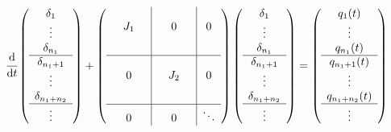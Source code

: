 \documentclass[]{uai2023}
\newcommand{\dt}[1]{\cfrac{\mathrm{d} #1}{\mathrm{d} t}}
\begin{document}
        \begin{equation}
            \dt{} 
            \left(\begin{array}{c}
                \delta_{1} \\ \vdots \\ \delta_{n_1} \\ 
                \hline
                \delta_{n_1 + 1} \\ \vdots \\ \delta_{n_1 + n_2} \\ 
                \hline
                \vdots 
            \end{array}\right)
            +
            \left(\begin{array}{c|c|c}
                \begin{matrix} && \\ &J_1& \\ && \end{matrix} & 0 & 0 \\[1.9em]
                \hline
                0 & \begin{matrix} && \\ &J_2& \\ && \end{matrix} & 0 \\[1.9em]
                \hline
                0 & 0 & \ddots 
            \end{array}\right)
            \left(\begin{array}{c}
                \delta_{1} \\ \vdots \\ \delta_{n_1} \\ 
                \hline
                \delta_{n_1 + 1} \\ \vdots \\ \delta_{n_1 + n_2} \\ 
                \hline
                \vdots 
            \end{array}\right)
            =
            \left(\begin{array}{c}
                q_{1}(t)\\\vdots\\ q_{n_1}(t) \\ 
                \hline
                q_{n_1 + 1}(t) \\ \vdots \\ q_{n_1 + n_2}(t) \\ 
                \hline
                \vdots 
            \end{array}\right)
        \end{equation}
    \endgroup
\end{document}
